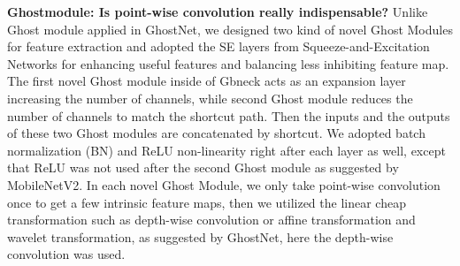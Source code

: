 \textbf{Ghostmodule: Is point-wise convolution really indispensable?} Unlike Ghost module applied in GhostNet\cite{19}, we designed two kind of novel Ghost Modules for feature extraction and adopted the SE layers from Squeeze-and-Excitation Networks \cite{24} for enhancing useful features and balancing less inhibiting feature map. The first novel Ghost module inside of Gbneck acts as an expansion layer increasing the number of channels, while second Ghost module reduces the number of channels to match the shortcut path. Then the inputs and the outputs of these two Ghost modules are concatenated by shortcut. We adopted batch normalization (BN) and ReLU non-linearity right after each layer as well\cite{19}, except that ReLU was not used after the second Ghost module as suggested by MobileNetV2\cite{30}. In each novel Ghost Module, we only take point-wise convolution once to get a few intrinsic feature maps, then we utilized the linear cheap transformation such as depth-wise convolution or affine transformation and wavelet transformation, as suggested by GhostNet\cite{19}, here the depth-wise convolution was used.

